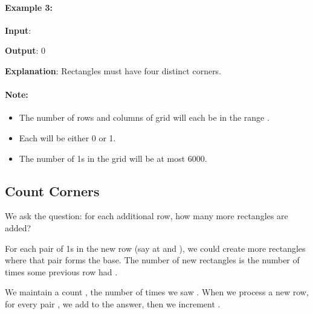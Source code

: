 \paragraph{Example 3:}

\begin{flushleft}
\textbf{Input}: 

\textbf{Output}: 0

\textbf{Explanation}: Rectangles must have four distinct corners.

\end{flushleft}
 

\paragraph{Note:}

\begin{itemize}
\item The number of rows and columns of grid will each be in the range \fcj{[1, 200]}.
\item Each  will be either 0 or 1.
\item The number of 1s in the grid will be at most 6000.

\end{itemize}

\subsection{Count Corners}
We ask the question: for each additional row, how many more rectangles are added?

For each pair of 1s in the new row (say at  and ), we could create more rectangles where that pair forms the base. The number of new rectangles is the number of times some previous row had .

We maintain a count , the number of times we saw . When we process a new row, for every pair , we add  to the answer, then we increment .

